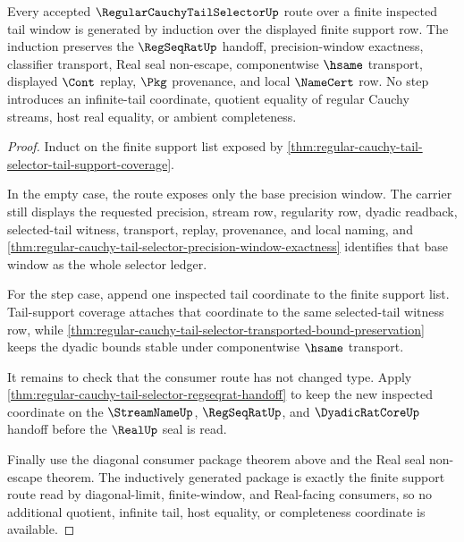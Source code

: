 \begin{theorem}
\label{thm:regular-cauchy-tail-selector-finite-induction}
Every accepted $\RegularCauchyTailSelectorUp$ route over a finite inspected tail window is generated by induction over the displayed finite support row. The induction preserves the $\RegSeqRatUp$ handoff, precision-window exactness, classifier transport, Real seal non-escape, componentwise $\hsame$ transport, displayed $\Cont$ replay, $\Pkg$ provenance, and local $\NameCert$ row. No step introduces an infinite-tail coordinate, quotient equality of regular Cauchy streams, host real equality, or ambient completeness.
\end{theorem}
\begin{proof}
Induct on the finite support list exposed by \autoref{thm:regular-cauchy-tail-selector-tail-support-coverage}.

In the empty case, the route exposes only the base precision window. The carrier still displays the requested precision, stream row, regularity row, dyadic readback, selected-tail witness, transport, replay, provenance, and local naming, and \autoref{thm:regular-cauchy-tail-selector-precision-window-exactness} identifies that base window as the whole selector ledger.

For the step case, append one inspected tail coordinate to the finite support list. Tail-support coverage attaches that coordinate to the same selected-tail witness row, while \autoref{thm:regular-cauchy-tail-selector-transported-bound-preservation} keeps the dyadic bounds stable under componentwise $\hsame$ transport.

It remains to check that the consumer route has not changed type. Apply \autoref{thm:regular-cauchy-tail-selector-regseqrat-handoff} to keep the new inspected coordinate on the $\StreamNameUp$, $\RegSeqRatUp$, and $\DyadicRatCoreUp$ handoff before the $\RealUp$ seal is read.

Finally use the diagonal consumer package theorem above and the Real seal non-escape theorem. The inductively generated package is exactly the finite support route read by diagonal-limit, finite-window, and Real-facing consumers, so no additional quotient, infinite tail, host equality, or completeness coordinate is available.
\end{proof}

